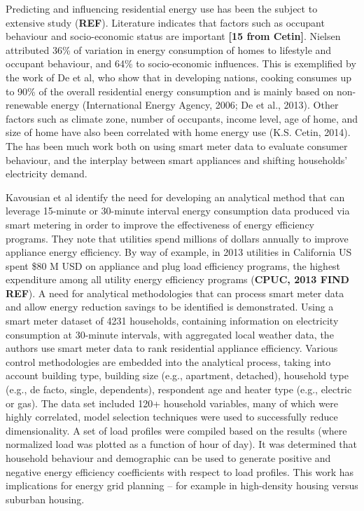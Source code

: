 \documentclass[11pt,]{article}
\begin{document}
Predicting and influencing residential energy use has been the subject
to extensive study (\textbf{REF}). Literature indicates that factors
such as occupant behaviour and socio-economic status are important
\textbf{{[}15 from Cetin{]}}. Nielsen attributed 36\% of variation in
energy consumption of homes to lifestyle and occupant behaviour, and
64\% to socio-economic influences. This is exemplified by the work of De
et al, who show that in developing nations, cooking consumes up to 90\%
of the overall residential energy consumption and is mainly based on
non-renewable energy (International Energy Agency, 2006; De et al.,
2013). Other factors such as climate zone, number of occupants, income
level, age of home, and size of home have also been correlated with home
energy use (K.S. Cetin, 2014). The has been much work both on using
smart meter data to evaluate consumer behaviour, and the interplay
between smart appliances and shifting households' electricity demand.

Kavousian et al identify the need for developing an analytical method
that can leverage 15-minute or 30-minute interval energy consumption
data produced via smart metering in order to improve the effectiveness
of energy efficiency programs. They note that utilities spend millions
of dollars annually to improve appliance energy efficiency. By way of
example, in 2013 utilities in California US spent \$80 M USD on
appliance and plug load efficiency programs, the highest expenditure
among all utility energy efficiency programs (\textbf{CPUC, 2013 FIND
REF}). A need for analytical methodologies that can process smart meter
data and allow energy reduction savings to be identified is
demonstrated. Using a smart meter dataset of 4231 households, containing
information on electricity consumption at 30-minute intervals, with
aggregated local weather data, the authors use smart meter data to rank
residential appliance efficiency. Various control methodologies are
embedded into the analytical process, taking into account building type,
building size (e.g., apartment, detached), household type (e.g., de
facto, single, dependents), respondent age and heater type (e.g.,
electric or gas). The data set included 120+ household variables, many
of which were highly correlated, model selection techniques were used to
successfully reduce dimensionality. A set of load profiles were compiled
based on the results (where normalized load was plotted as a function of
hour of day). It was determined that household behaviour and demographic
can be used to generate positive and negative energy efficiency
coefficients with respect to load profiles. This work has implications
for energy grid planning -- for example in high-density housing versus
suburban housing.
\end{document}
